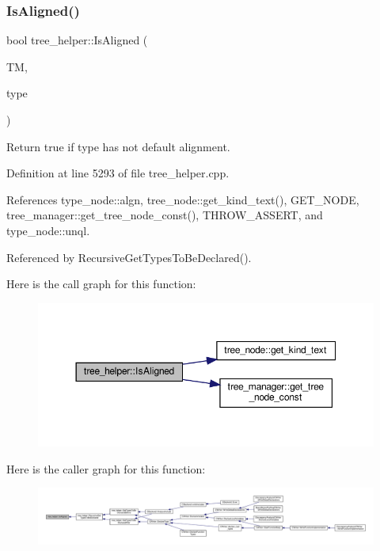 \subsubsection{\texorpdfstring{Is\+Aligned()}{IsAligned()}}
{\footnotesize\ttfamily bool tree\+\_\+helper\+::\+Is\+Aligned (\begin{DoxyParamCaption}\item[{const \hyperlink{tree__manager_8hpp_a792e3f1f892d7d997a8d8a4a12e39346}{tree\+\_\+manager\+Const\+Ref} \&}]{TM,  }\item[{unsigned int}]{type }\end{DoxyParamCaption})\hspace{0.3cm}{\ttfamily [static]}}



Return true if type has not default alignment. 



Definition at line 5293 of file tree\+\_\+helper.\+cpp.



References type\+\_\+node\+::algn, tree\+\_\+node\+::get\+\_\+kind\+\_\+text(), G\+E\+T\+\_\+\+N\+O\+DE, tree\+\_\+manager\+::get\+\_\+tree\+\_\+node\+\_\+const(), T\+H\+R\+O\+W\+\_\+\+A\+S\+S\+E\+RT, and type\+\_\+node\+::unql.



Referenced by Recursive\+Get\+Types\+To\+Be\+Declared().

Here is the call graph for this function\+:
\nopagebreak
\begin{figure}[H]
\begin{center}
\leavevmode
\includegraphics[width=350pt]{d7/d99/classtree__helper_a4d36920cdb412e76abae84bf9700629f_cgraph}
\end{center}
\end{figure}
Here is the caller graph for this function\+:
\nopagebreak
\begin{figure}[H]
\begin{center}
\leavevmode
\includegraphics[width=350pt]{d7/d99/classtree__helper_a4d36920cdb412e76abae84bf9700629f_icgraph}
\end{center}
\end{figure}
\mbox{\label{classtree__helper_af59d37bb4b3cdfddc3973686f17d3deb}} 

